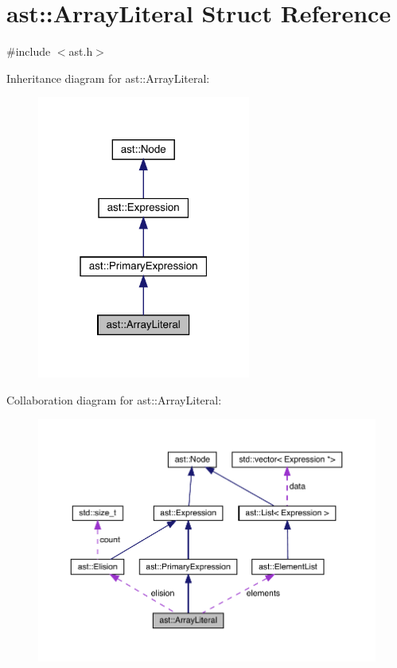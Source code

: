 \hypertarget{structast_1_1_array_literal}{}\section{ast\+:\+:Array\+Literal Struct Reference}
\label{structast_1_1_array_literal}


{\ttfamily \#include $<$ast.\+h$>$}



Inheritance diagram for ast\+:\+:Array\+Literal\+:
\nopagebreak
\begin{figure}[H]
\begin{center}
\leavevmode
\includegraphics[width=199pt]{structast_1_1_array_literal__inherit__graph}
\end{center}
\end{figure}


Collaboration diagram for ast\+:\+:Array\+Literal\+:
\nopagebreak
\begin{figure}[H]
\begin{center}
\leavevmode
\includegraphics[width=350pt]{structast_1_1_array_literal__coll__graph}
\end{center}
\end{figure}
